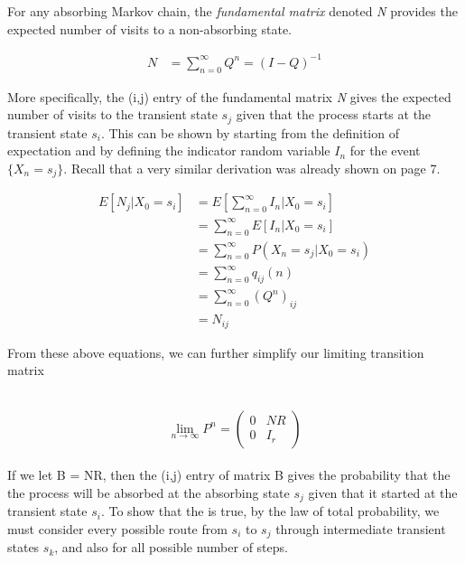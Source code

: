 \documentclass[a4paper, 12pt]{article}
\begin{document}
For any absorbing Markov chain, the \textit{fundamental matrix} denoted \textit{N} provides the expected number of visits to a non-absorbing state. 

	\begin{equation*}
	\begin{aligned}
	 	N &= \sum_{n=0}^\infty Q^n = (I-Q)^{-1}
	\end{aligned}
	\end{equation*}	
	
More specifically, the (i,j) entry of the fundamental matrix \textit{N} gives the expected number of visits to the transient state $s_j$ given that the process starts at the transient state $s_i$. This can be shown by starting from the definition of expectation and by defining the indicator random variable $I_n$ for the event $\{X_n = s_j\}$. Recall that a very similar derivation was already shown on page 7.

	\begin{equation*}
	\begin{aligned}
		 E[N_j|X_0 = s_i] &= E\left[\sum_{n=0}^\infty I_n | X_0 = s_i\right] \\
		 				  &= \sum_{n=0}^\infty E\left[I_n | X_0 = s_i\right] \\
		 				  &= \sum_{n=0}^\infty P(X_n = s_j | X_0 = s_i) \\
		 				  &= \sum_{n=0}^\infty q_{ij}(n) \\
		 				  &= \sum_{n=0}^\infty (Q^n)_{ij} \\
		 				  &= N_{ij}
	\end{aligned}
	\end{equation*}

From these above equations, we can further simplify our limiting transition matrix

\\
  	 \[
    \lim_{n\to\infty}P^n = \left(
    \begin{array}{c|c}
      0 & NR \\
      \hline
      0 & I_r
    \end{array}
    \right)
  \]
\\

If we let B = NR, then the (i,j) entry of matrix B gives the probability that the the process will be absorbed at the absorbing state $s_j$ given that it started at the transient state $s_i$. To show that the is true, by the law of total probability, we must consider every possible route from $s_i$ to $s_j$ through intermediate transient states $s_k$, and also for all possible number of steps.
\end{document}
